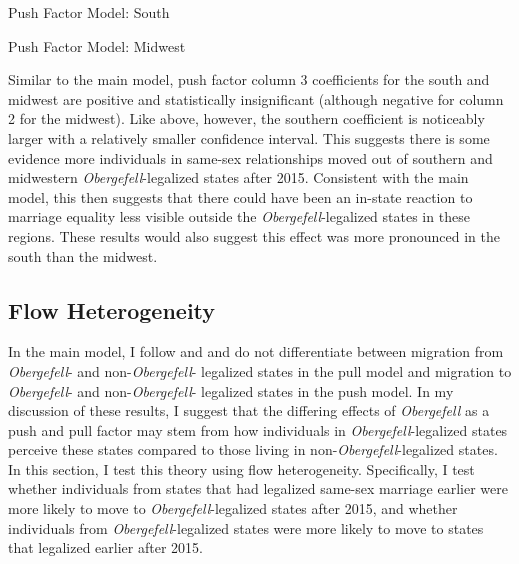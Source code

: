 \documentclass[12pt,letterpaper]{article}
\begin{document}
\begin{table}[htbp] %
    \centering
    \caption{Push Factor Model: South}
    \label{tab: south_exante_model}
    
\end{table}
\begin{table}[htbp] %
    \centering
    \caption{Push Factor Model: Midwest}
    \label{tab: midwest_exante_model}
    
\end{table}

Similar to the main model, push factor column 3 coefficients for the south and midwest are positive and statistically insignificant (although negative for column 2 for the midwest). Like above, however, the southern coefficient is noticeably larger with a relatively smaller confidence interval. This suggests there is some evidence more individuals in same-sex relationships moved out of southern and midwestern \textit{Obergefell}-legalized states after 2015. Consistent with the main model, this then suggests that there could have been an in-state reaction to marriage equality less visible outside the \textit{Obergefell}-legalized states in these regions. These results would also suggest this effect was more pronounced in the south than the midwest.


\FloatBarrier
\subsection{Flow Heterogeneity}


In the main model, I follow \citet{1} and \citet{12} and do not differentiate between migration from \textit{Obergefell}- and non-\textit{Obergefell}- legalized states in the pull model and migration to \textit{Obergefell}- and non-\textit{Obergefell}- legalized states in the push model.  In my discussion of these results, I suggest that the differing effects of \textit{Obergefell} as a push and pull factor may stem from how individuals in \textit{Obergefell}-legalized states perceive these states compared to those living in non-\textit{Obergefell}-legalized states.  In this section, I test this theory using flow heterogeneity.  Specifically, I test whether individuals from states that had legalized same-sex marriage earlier were more likely to move to \textit{Obergefell}-legalized states after 2015, and whether individuals from \textit{Obergefell}-legalized states were more likely to move to states that legalized earlier after 2015.
\end{document}
